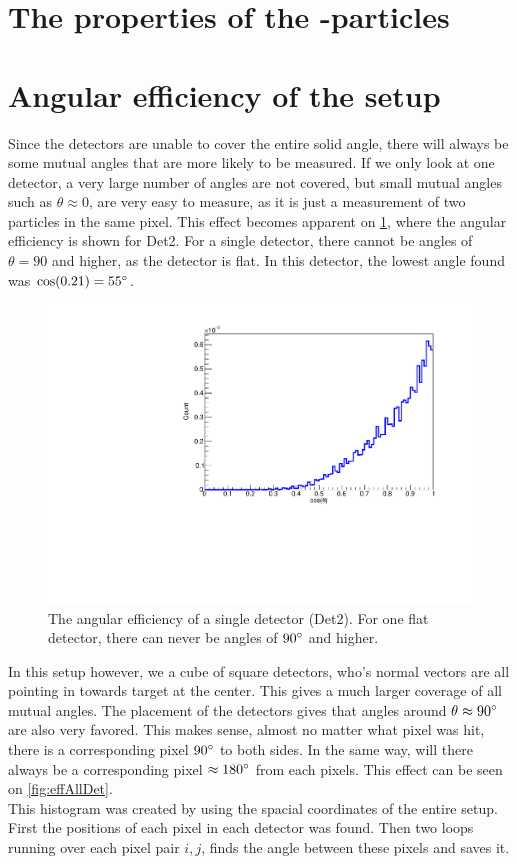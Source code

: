\section{The properties of the \al-particles}


\section{Angular efficiency of the setup}
Since the detectors are unable to cover the entire solid angle, there will always be some mutual angles that are more likely to be measured. 
If we only look at one detector, a very large number of angles are not covered, but small mutual angles such as $\theta \approx 0$, are very easy to measure, as it is just a measurement of two particles in the same pixel. 
This effect becomes apparent on \cref{fig:oneDetEff}, where the angular efficiency is shown for Det2. For a single detector, there cannot be angles of $\theta = 90$ and higher, as the detector is flat. In this detector, the lowest angle found was $\cos(0.21) = 55\degree$.\\

\begin{figure}[h]
	\includegraphics[width=\linewidth]{../figures/det2Eff.pdf}
	\caption{The angular efficiency of a single detector (Det2). For one flat detector, there can never be angles of $90\degree$ and higher.}
	\label{fig:oneDetEff}
\end{figure}
In this setup however, we a cube of square detectors, who's normal vectors are all pointing in towards target at the center. This gives a much larger coverage of all mutual angles. 
The placement of the detectors gives that angles around $\theta \approx 90 \degree$ are also very favored. This makes sense, almost no matter what pixel was hit, there is a corresponding pixel $90\degree$ to both sides. In the same way, will there always be a corresponding pixel $\approx 180\degree$ from each pixels. This effect can be seen on \cref{fig:effAllDet}. \\
This histogram was created by using the spacial coordinates of the entire setup. First the positions of each pixel in each detector was found. Then two loops running over each pixel pair $i, j$, finds the angle between these pixels and saves it.\\

